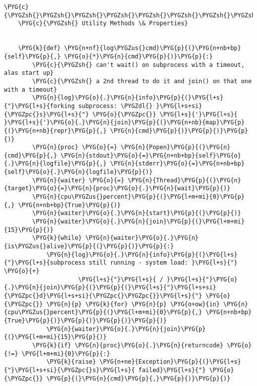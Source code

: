 \begin{Verbatim}[commandchars=\\\{\}]
    \PYG{c}{\PYGZsh{}\PYGZsh{}\PYGZsh{}\PYGZsh{}\PYGZsh{}\PYGZsh{}\PYGZsh{}\PYGZsh{}\PYGZsh{}\PYGZsh{}\PYGZsh{}\PYGZsh{}\PYGZsh{}\PYGZsh{}\PYGZsh{}\PYGZsh{}\PYGZsh{}\PYGZsh{}\PYGZsh{}\PYGZsh{}\PYGZsh{}\PYGZsh{}\PYGZsh{}\PYGZsh{}\PYGZsh{}\PYGZsh{}\PYGZsh{}\PYGZsh{}\PYGZsh{}\PYGZsh{}\PYGZsh{}\PYGZsh{}\PYGZsh{}\PYGZsh{}\PYGZsh{}\PYGZsh{}\PYGZsh{}\PYGZsh{}\PYGZsh{}\PYGZsh{}\PYGZsh{}\PYGZsh{}\PYGZsh{}\PYGZsh{}\PYGZsh{}\PYGZsh{}\PYGZsh{}\PYGZsh{}\PYGZsh{}\PYGZsh{}\PYGZsh{}\PYGZsh{}\PYGZsh{}\PYGZsh{}\PYGZsh{}\PYGZsh{}\PYGZsh{}\PYGZsh{}\PYGZsh{}\PYGZsh{}\PYGZsh{}\PYGZsh{}\PYGZsh{}\PYGZsh{}\PYGZsh{}\PYGZsh{}\PYGZsh{}\PYGZsh{}\PYGZsh{}\PYGZsh{}\PYGZsh{}\PYGZsh{}\PYGZsh{}\PYGZsh{}\PYGZsh{}\PYGZsh{}}
    \PYG{c}{\PYGZsh{} Utility Methods \& Properties}


    \PYG{k}{def} \PYG{n+nf}{log\PYGZus{}cmd}\PYG{p}{(}\PYG{n+nb+bp}{self}\PYG{p}{,} \PYG{o}{*}\PYG{n}{cmd}\PYG{p}{)}\PYG{p}{:}
        \PYG{c}{\PYGZsh{} can't wait() on subprocess with a timeout, alas start up}
        \PYG{c}{\PYGZsh{} a 2nd thread to do it and join() on that one with a timeout}
        \PYG{n}{log}\PYG{o}{.}\PYG{n}{info}\PYG{p}{(}\PYG{l+s}{"}\PYG{l+s}{forking subprocess: \PYGZdl{} }\PYG{l+s+si}{\PYGZpc{}s}\PYG{l+s}{"} \PYG{o}{\PYGZpc{}} \PYG{l+s}{'}\PYG{l+s}{ }\PYG{l+s}{'}\PYG{o}{.}\PYG{n}{join}\PYG{p}{(}\PYG{n+nb}{map}\PYG{p}{(}\PYG{n+nb}{repr}\PYG{p}{,} \PYG{n}{cmd}\PYG{p}{)}\PYG{p}{)}\PYG{p}{)}
        \PYG{n}{proc} \PYG{o}{=} \PYG{n}{Popen}\PYG{p}{(}\PYG{n}{cmd}\PYG{p}{,} \PYG{n}{stdout}\PYG{o}{=}\PYG{n+nb+bp}{self}\PYG{o}{.}\PYG{n}{logfile}\PYG{p}{,} \PYG{n}{stderr}\PYG{o}{=}\PYG{n+nb+bp}{self}\PYG{o}{.}\PYG{n}{logfile}\PYG{p}{)}
        \PYG{n}{waiter} \PYG{o}{=} \PYG{n}{Thread}\PYG{p}{(}\PYG{n}{target}\PYG{o}{=}\PYG{n}{proc}\PYG{o}{.}\PYG{n}{wait}\PYG{p}{)}
        \PYG{n}{cpu\PYGZus{}percent}\PYG{p}{(}\PYG{l+m+mi}{0}\PYG{p}{,} \PYG{n+nb+bp}{True}\PYG{p}{)}
        \PYG{n}{waiter}\PYG{o}{.}\PYG{n}{start}\PYG{p}{(}\PYG{p}{)}
        \PYG{n}{waiter}\PYG{o}{.}\PYG{n}{join}\PYG{p}{(}\PYG{l+m+mi}{15}\PYG{p}{)}
        \PYG{k}{while} \PYG{n}{waiter}\PYG{o}{.}\PYG{n}{is\PYGZus{}alive}\PYG{p}{(}\PYG{p}{)}\PYG{p}{:}
            \PYG{n}{log}\PYG{o}{.}\PYG{n}{info}\PYG{p}{(}\PYG{l+s}{"}\PYG{l+s}{subprocess still running - system load: }\PYG{l+s}{"} \PYG{o}{+}
                     \PYG{l+s}{"}\PYG{l+s}{ / }\PYG{l+s}{"}\PYG{o}{.}\PYG{n}{join}\PYG{p}{(}\PYG{p}{(}\PYG{l+s}{"}\PYG{l+s+si}{\PYGZpc{}d}\PYG{l+s+si}{\PYGZpc{}\PYGZpc{}}\PYG{l+s}{"} \PYG{o}{\PYGZpc{}} \PYG{n}{p} \PYG{k}{for} \PYG{n}{p} \PYG{o+ow}{in} \PYG{n}{cpu\PYGZus{}percent}\PYG{p}{(}\PYG{l+m+mi}{0}\PYG{p}{,} \PYG{n+nb+bp}{True}\PYG{p}{)}\PYG{p}{)}\PYG{p}{)}\PYG{p}{)}
            \PYG{n}{waiter}\PYG{o}{.}\PYG{n}{join}\PYG{p}{(}\PYG{l+m+mi}{15}\PYG{p}{)}
        \PYG{k}{if} \PYG{n}{proc}\PYG{o}{.}\PYG{n}{returncode} \PYG{o}{!=} \PYG{l+m+mi}{0}\PYG{p}{:}
            \PYG{k}{raise} \PYG{n+ne}{Exception}\PYG{p}{(}\PYG{l+s}{"}\PYG{l+s+si}{\PYGZpc{}s}\PYG{l+s}{ failed}\PYG{l+s}{"} \PYG{o}{\PYGZpc{}} \PYG{p}{(}\PYG{n}{cmd}\PYG{p}{,}\PYG{p}{)}\PYG{p}{)}


\end{Verbatim}

